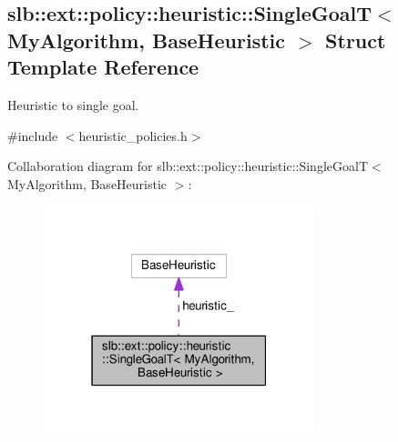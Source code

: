 \hypertarget{structslb_1_1ext_1_1policy_1_1heuristic_1_1SingleGoalT}{}\subsection{slb\+:\+:ext\+:\+:policy\+:\+:heuristic\+:\+:Single\+GoalT$<$ My\+Algorithm, Base\+Heuristic $>$ Struct Template Reference}
\label{structslb_1_1ext_1_1policy_1_1heuristic_1_1SingleGoalT}


Heuristic to single goal.  




{\ttfamily \#include $<$heuristic\+\_\+policies.\+h$>$}



Collaboration diagram for slb\+:\+:ext\+:\+:policy\+:\+:heuristic\+:\+:Single\+GoalT$<$ My\+Algorithm, Base\+Heuristic $>$\+:\nopagebreak
\begin{figure}[H]
\begin{center}
\leavevmode
\includegraphics[width=223pt]{structslb_1_1ext_1_1policy_1_1heuristic_1_1SingleGoalT__coll__graph}
\end{center}
\end{figure}
